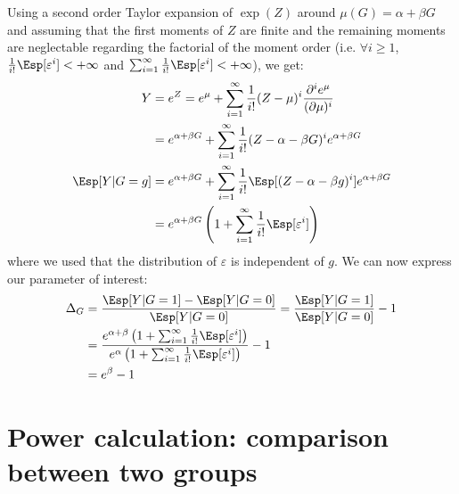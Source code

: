 \documentclass[12pt]{article}
\begin{document}
Using a second order Taylor expansion of \(\exp(Z)\) around
\(\mu(G)=\alpha + \beta G\) and assuming that the first moments of
\(Z\) are finite and the remaining moments are neglectable regarding
the factorial of the moment order (i.e. \(\forall i \geq 1\),
\(\frac{1}{i!}\Esp[\varepsilon^i ]< +\infty\) and \(\sum_{i=1}^{\infty} \frac{1}{i!}\Esp[\varepsilon^i ]< +\infty\)), we get:
\begin{align*}
Y &= e^{Z} = e^{\mu} + \sum_{i=1}^{\infty} \frac{1}{i!} (Z - \mu)^i \frac{\partial^i e^{\mu}}{(\partial \mu)^i} \\
&= e^{\alpha + \beta G} + \sum_{i=1}^{\infty} \frac{1}{i!} (Z - \alpha - \beta G)^i e^{\alpha + \beta G} \\
\Esp[Y|G=g] &= e^{\alpha + \beta G} + \sum_{i=1}^{\infty} \frac{1}{i!} \Esp[(Z - \alpha - \beta g)^i] e^{\alpha + \beta G} \\
&= e^{\alpha + \beta G} \left(1 + \sum_{i=1}^{\infty} \frac{1}{i!} \Esp[\varepsilon^i] \right)
\end{align*}
where we used that the distribution of \(\varepsilon\) is independent
of \(g\). We can now express our parameter of interest:
\begin{align*}
\Delta_G &= \frac{\Esp[Y|G=1]-\Esp[Y|G=0]}{\Esp[Y|G=0]} = \frac{\Esp[Y|G=1]}{\Esp[Y|G=0]} - 1 \\
&= \frac{e^{\alpha + \beta} \left(1 + \sum_{i=1}^{\infty} \frac{1}{i!} \Esp[\varepsilon^{i}] \right)}{e^{\alpha} \left(1 + \sum_{i=1}^{\infty} \frac{1}{i!} \Esp[\varepsilon^{i}] \right)} - 1 \\
&= e^{\beta} - 1
\end{align*}


\clearpage

\section{Power calculation: comparison between two groups}
\label{sec:org5c289c9}
\end{document}
